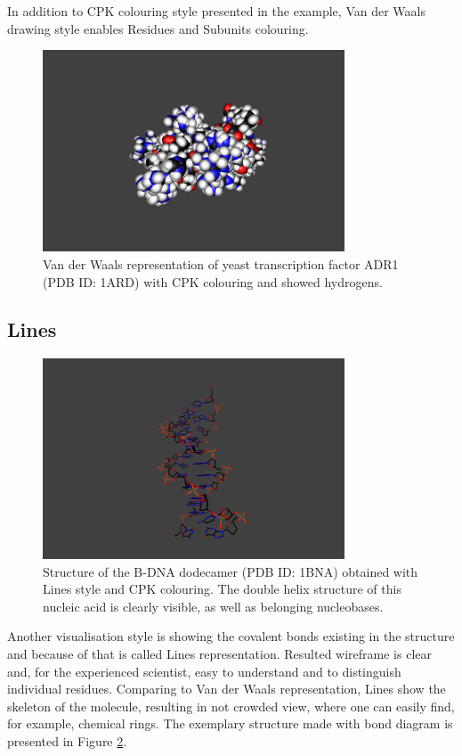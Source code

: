 In addition to CPK colouring style presented in the example, Van der Waals drawing style enables Residues and Subunits colouring. 

\begin{figure}[!htb]
\centering    
\includegraphics[width=0.8\textwidth]{Figs/vdw.png}
\caption{Van der Waals representation of yeast transcription factor ADR1 (PDB ID: 1ARD) with CPK colouring and showed hydrogens.}
\label{fig:vdw} 
\end{figure}

\subsection{Lines}
\begin{figure}[!htb]
\centering    
\includegraphics[width=0.8\textwidth]{Figs/lines.png}
\caption{Structure of the B-DNA dodecamer (PDB ID: 1BNA) obtained with Lines style and CPK colouring. The double helix structure of this nucleic acid is clearly visible, as well as belonging nucleobases.}
\label{fig:lines} 
\end{figure}

Another visualisation style is showing the covalent bonds existing in the structure and because of that is called Lines representation. Resulted wireframe is clear and, for the experienced scientist, easy to understand and to distinguish individual residues. Comparing to Van der Waals representation, Lines show the skeleton of the molecule, resulting in not crowded view, where one can easily find, for example, chemical rings. The exemplary structure made with bond diagram is presented in Figure  \ref{fig:lines}.

